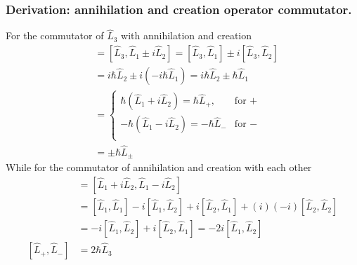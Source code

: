 \documentclass[../../../main.tex]{subfiles}
\begin{document}
\subsubsection{Derivation: annihilation and creation operator commutator.}
For the commutator of $\hat{L}_3$ with annihilation and creation
\begin{align*}
    [\hat{L}_3, \hat{L}_\pm]
     & =  [\hat{L}_3, \hat{L}_1 \pm i\hat{L}_2] = [\hat{L}_3, \hat{L}_1] \pm i[\hat{L}_3, \hat{L}_2] \\
     & =  i\hbar \hat{L}_2 \pm i(-i\hbar \hat{L}_1)=  i\hbar \hat{L}_2 \pm \hbar \hat{L}_1           \\
     & = \begin{cases}
             \hbar(\hat{L}_1 + i\hat{L}_2) = \hbar \hat{L}_+,  & \text{for } + \\
             -\hbar(\hat{L}_1 - i\hat{L}_2) = -\hbar \hat{L}_- & \text{for } - \\
         \end{cases}                           \\
     & =  \pm \hbar \hat{L}_\pm
\end{align*}
While for the commutator of annihilation and creation with each other
\begin{align*}
    [\hat{L}_{+}, \hat{L}_{-}]
     & =  [\hat{L}_1 + i\hat{L}_2, \hat{L}_1 - i\hat{L}_2]                                                           \\
     & =  [\hat{L}_1, \hat{L}_1] - i[\hat{L}_1, \hat{L}_2] + i[\hat{L}_2, \hat{L}_1] + (i)(-i)[\hat{L}_2, \hat{L}_2] \\
     & =  -i[\hat{L}_1, \hat{L}_2] + i[\hat{L}_2, \hat{L}_1]=-2i[\hat{L}_1, \hat{L}_2]                               \\
    [\hat{L}_{+}, \hat{L}_{-}]
     & =  2\hbar \hat{L}_3                                                                                           \\
\end{align*}
\end{document}
